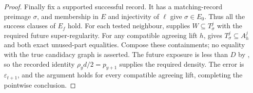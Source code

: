 \begin{proof}
Finally fix a supported successful record. It has a matching-record
preimage $\sigma$, and membership in $E$ and injectivity of $\ell$
give $\sigma\in E_0$. Thus all the success clauses of $E_f$ hold.
For each tested neighbour, 
supplies $W\subseteq T^j_\sigma$ with the required future
super-regularity. For any compatible agreeing lift $h$,
 gives
$T^j_\sigma\subseteq A_h^j$ and both exact unused-part equalities.
Compose these containments; no equality with the true candidacy graph
is asserted. The future exposure is less than $D$ by
, so the recorded identity
$\rho_y d/2=p_{y+1}$ supplies the required density.
The error is $\varepsilon_{t+1}$, and the argument holds for every
compatible agreeing lift, completing the pointwise conclusion.
\end{proof}
